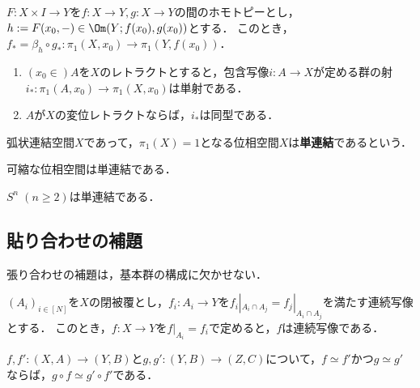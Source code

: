 \documentclass[uplatex, dvipdfmx]{jsreport}
\begin{document}
\begin{lemma}
    $F:X\times I\to Y$を$f:X\to Y,g:X\to Y$の間のホモトピーとし，$h:=F(x_0,-)\in\Om(Y;f(x_0),g(x_0))$とする．
    このとき，$f_*=\beta_h\circ g_*:\pi_1(X,x_0)\to\pi_1(Y,f(x_0))$．
\end{lemma}

\begin{proposition}\mbox{}
    \begin{enumerate}
        \item $(x_0\in)A$を$X$のレトラクトとすると，包含写像$i:A\to X$が定める群の射$i_*:\pi_1(A,x_0)\to\pi_1(X,x_0)$は単射である．
        \item $A$が$X$の変位レトラクトならば，$i_*$は同型である．
    \end{enumerate}
\end{proposition}

\begin{definition}
    弧状連結空間$X$であって，$\pi_1(X)=1$となる位相空間$X$は\textbf{単連結}であるという．
\end{definition}
\begin{example}
    可縮な位相空間は単連結である．
\end{example}

\begin{proposition}
    $S^n\;(n\ge 2)$は単連結である．
\end{proposition}

\subsection{貼り合わせの補題}

\begin{tcolorbox}[colframe=ForestGreen, colback=ForestGreen!10!white,breakable,colbacktitle=ForestGreen!40!white,coltitle=black,fonttitle=\bfseries\sffamily,
title=]
    張り合わせの補題は，基本群の構成に欠かせない．
\end{tcolorbox}

\begin{lemma}[貼り合わせの補題]
    $(A_i)_{i\in[N]}$を$X$の閉被覆とし，$f_i:A_i\to Y$を$f_i|_{A_i\cap A_j}=f_j|_{A_i\cap A_j}$を満たす連続写像とする．
    このとき，$f:X\to Y$を$f|_{A_i}=f_i$で定めると，$f$は連続写像である．
\end{lemma}

\begin{proposition}
    $f,f':(X,A)\to(Y,B)$と$g,g':(Y,B)\to(Z,C)$について，$f\simeq f'$かつ$g\simeq g'$ならば，$g\circ f\simeq g'\circ f'$である．
\end{proposition}
\end{document}
